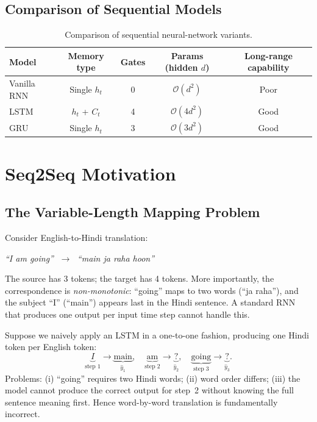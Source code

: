 \documentclass[12pt,a4paper]{article}
\begin{document}
\subsection{Comparison of Sequential Models}

\begin{table}[htbp]
  \centering
  \caption{Comparison of sequential neural-network variants.}
  \label{tab:rnn_comparison}
  \begin{tabular}{@{}lcccc@{}}
    \toprule
    \textbf{Model} & \textbf{Memory type} & \textbf{Gates} & \textbf{Params (hidden $d$)} & \textbf{Long-range capability} \\
    \midrule
    Vanilla RNN & Single $h_t$ & 0 & $\mathcal{O}(d^2)$ & Poor \\
    LSTM        & $h_t$ + $C_t$  & 4 & $\mathcal{O}(4d^2)$ & Good \\
    GRU         & Single $h_t$ & 3 & $\mathcal{O}(3d^2)$ & Good \\
    \bottomrule
  \end{tabular}
\end{table}

\section{Seq2Seq Motivation}
\label{sec:motivation}

\subsection{The Variable-Length Mapping Problem}

Consider English-to-Hindi translation:
\begin{center}
  \textit{``I am going''} $\;\longrightarrow\;$ \textit{``main ja raha hoon''}
\end{center}
The source has 3 tokens; the target has 4 tokens. More importantly, the correspondence is
\emph{non-monotonic}: ``going'' maps to two words (``ja raha''), and the subject ``I'' (``main'')
appears last in the Hindi sentence. A standard RNN that produces one output per input time step
cannot handle this.

\begin{example}[title={Why word-by-word translation fails}]
  Suppose we naively apply an LSTM in a one-to-one fashion, producing one Hindi token per English
  token:
  \[
    \underbrace{I}_{\text{step 1}} \to \underbrace{\text{main}}_{\hat{y}_1}, \quad
    \underbrace{\text{am}}_{\text{step 2}} \to \underbrace{?}_{\hat{y}_2}, \quad
    \underbrace{\text{going}}_{\text{step 3}} \to \underbrace{?}_{\hat{y}_3}.
  \]
  Problems: (i) ``going'' requires two Hindi words; (ii) word order differs; (iii) the model cannot
  produce the correct output for step~2 without knowing the full sentence meaning first.
  Hence word-by-word translation is fundamentally incorrect.
\end{example}
\end{document}
